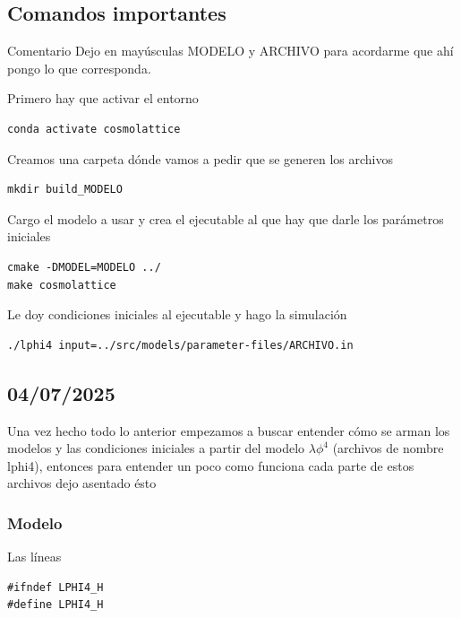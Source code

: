 \subsection{Comandos importantes}

\begin{infobox}[cyan]{Comentario}
    Dejo en mayúsculas MODELO y ARCHIVO para acordarme que ahí pongo lo que corresponda.
\end{infobox}

Primero hay que activar el entorno

\begin{lstlisting}[style = bashStyle]
conda activate cosmolattice
\end{lstlisting}

Creamos una carpeta dónde vamos a pedir que se generen los archivos

\begin{lstlisting}[style = bashStyle]
mkdir build_MODELO
\end{lstlisting}

Cargo el modelo a usar y crea el ejecutable al que hay que darle los parámetros iniciales

\begin{lstlisting}[style = bashStyle]
cmake -DMODEL=MODELO ../
make cosmolattice
\end{lstlisting}

Le doy condiciones iniciales al ejecutable y hago la simulación

\begin{lstlisting}[style = bashStyle]
./lphi4 input=../src/models/parameter-files/ARCHIVO.in
\end{lstlisting}

\subsection{04/07/2025}

Una vez hecho todo lo anterior empezamos a buscar entender cómo se arman los modelos y las condiciones iniciales a partir del modelo $\lambda \phi^4$ (archivos de nombre lphi4), entonces para entender un poco como funciona cada parte de estos archivos dejo asentado ésto

\subsubsection{Modelo}

Las líneas

\begin{lstlisting}[style = cppStyle]
#ifndef LPHI4_H
#define LPHI4_H
\end{lstlisting}

